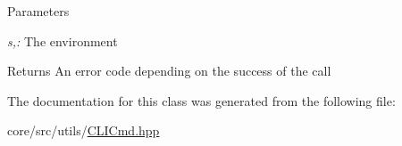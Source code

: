 \begin{DoxyParams}{Parameters}
\item[{\em s,:}]The environment \end{DoxyParams}
\begin{DoxyReturn}{Returns}
An error code depending on the success of the call 
\end{DoxyReturn}


The documentation for this class was generated from the following file:\begin{DoxyCompactItemize}
\item 
core/src/utils/\hyperlink{CLICmd_8hpp}{CLICmd.hpp}\end{DoxyCompactItemize}
